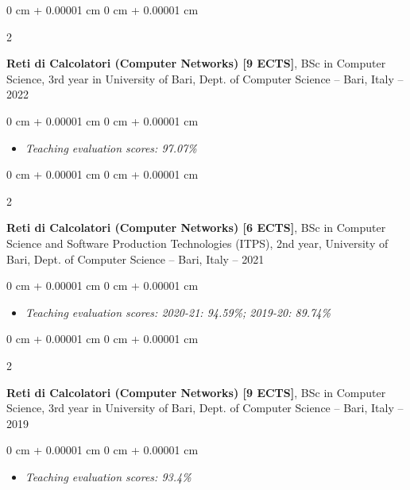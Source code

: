 \documentclass[10pt, a4paper]{article}
\newenvironment{highlights}{
    \begin{itemize}[
        topsep=0.10 cm,
        parsep=0.10 cm,
        partopsep=0pt,
        itemsep=0pt,
        leftmargin=0 cm + 10pt
    ]
}{
    \end{itemize}
} %
\newenvironment{onecolentry}{
    \begin{adjustwidth}{
        0 cm + 0.00001 cm
    }{
        0 cm + 0.00001 cm
    }
}{
    \end{adjustwidth}
} %
\newenvironment{twocolentry}[2][]{
    \onecolentry
    \def\secondColumn{#2}
    \setcolumnwidth{\fill, 4.5 cm}
    \begin{paracol}{2}
}{
    \switchcolumn \raggedleft \secondColumn
    \end{paracol}
    \endonecolentry
} %
\begin{document}
        \vspace{0.2 cm}

        \begin{twocolentry}{
            2021 – 2022
        }
            \textbf{Reti di Calcolatori (Computer Networks) [9 ECTS]}, BSc in Computer Science, 3rd year in University of Bari, Dept. of Computer Science -- Bari, Italy\end{twocolentry}

        \vspace{0.10 cm}
        \begin{onecolentry}
            \begin{highlights}
                \item \textit{Teaching evaluation scores: 97.07\%}
            \end{highlights}
        \end{onecolentry}


        \vspace{0.2 cm}

        \begin{twocolentry}{
            2019 – 2021
        }
            \textbf{Reti di Calcolatori (Computer Networks) [6 ECTS]}, BSc in Computer Science and Software Production Technologies (ITPS), 2nd year, University of Bari, Dept. of Computer Science -- Bari, Italy\end{twocolentry}

        \vspace{0.10 cm}
        \begin{onecolentry}
            \begin{highlights}
                \item \textit{Teaching evaluation scores: 2020-21: 94.59\%; 2019-20: 89.74\%}
            \end{highlights}
        \end{onecolentry}


        \vspace{0.2 cm}

        \begin{twocolentry}{
            2018 – 2019
        }
            \textbf{Reti di Calcolatori (Computer Networks) [9 ECTS]}, BSc in Computer Science, 3rd year in University of Bari, Dept. of Computer Science -- Bari, Italy\end{twocolentry}

        \vspace{0.10 cm}
        \begin{onecolentry}
            \begin{highlights}
                \item \textit{Teaching evaluation scores: 93.4\%}
            \end{highlights}
        \end{onecolentry}
\end{document}
